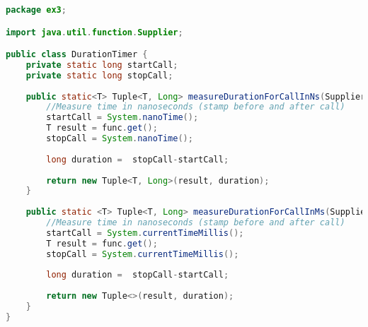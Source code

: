 \begin{lstlisting}[language=java,
    label=lst:durtimer,
    caption=DurationTimer to measure timings of function calls that provide any type of result
]
package ex3;

import java.util.function.Supplier;

public class DurationTimer {
	private static long startCall;
	private static long stopCall;
	
	public static<T> Tuple<T, Long> measureDurationForCallInNs(Supplier<T> func) {
		//Measure time in nanoseconds (stamp before and after call)
		startCall = System.nanoTime();
		T result = func.get();
		stopCall = System.nanoTime();
		
		long duration =  stopCall-startCall;
		
		return new Tuple<T, Long>(result, duration);
	}
	
	public static <T> Tuple<T, Long> measureDurationForCallInMs(Supplier<T> func) {
		//Measure time in nanoseconds (stamp before and after call)
		startCall = System.currentTimeMillis();
		T result = func.get();
		stopCall = System.currentTimeMillis();
		
		long duration =  stopCall-startCall;
		
		return new Tuple<>(result, duration);
	}
}
\end{lstlisting}